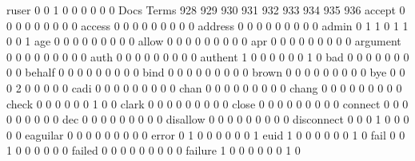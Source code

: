 \documentclass[compress,8pt]{beamer}
\begin{document}
\begin{frame}
\begin{Schunk}
  ruser                                      0   0   1   0   0   0   0   0   0
                                          Docs
Terms                                      928 929 930 931 932 933 934 935 936
  accept                                     0   0   0   0   0   0   0   0   0
  access                                     0   0   0   0   0   0   0   0   0
  address                                    0   0   0   0   0   0   0   0   0
  admin                                      0   1   1   0   1   1   0   0   1
  age                                        0   0   0   0   0   0   0   0   0
  allow                                      0   0   0   0   0   0   0   0   0
  apr                                        0   0   0   0   0   0   0   0   0
  argument                                   0   0   0   0   0   0   0   0   0
  auth                                       0   0   0   0   0   0   0   0   0
  authent                                    1   0   0   0   0   0   0   1   0
  bad                                        0   0   0   0   0   0   0   0   0
  behalf                                     0   0   0   0   0   0   0   0   0
  bind                                       0   0   0   0   0   0   0   0   0
  brown                                      0   0   0   0   0   0   0   0   0
  bye                                        0   0   0   2   0   0   0   0   0
  cadi                                       0   0   0   0   0   0   0   0   0
  chan                                       0   0   0   0   0   0   0   0   0
  chang                                      0   0   0   0   0   0   0   0   0
  check                                      0   0   0   0   0   0   1   0   0
  clark                                      0   0   0   0   0   0   0   0   0
  close                                      0   0   0   0   0   0   0   0   0
  connect                                    0   0   0   0   0   0   0   0   0
  dec                                        0   0   0   0   0   0   0   0   0
  disallow                                   0   0   0   0   0   0   0   0   0
  disconnect                                 0   0   0   1   0   0   0   0   0
  eaguilar                                   0   0   0   0   0   0   0   0   0
  error                                      0   1   0   0   0   0   0   0   1
  euid                                       1   0   0   0   0   0   0   1   0
  fail                                       0   0   1   0   0   0   0   0   0
  failed                                     0   0   0   0   0   0   0   0   0
  failure                                    1   0   0   0   0   0   0   1   0

\end{Schunk}
\end{frame}
\end{document}
